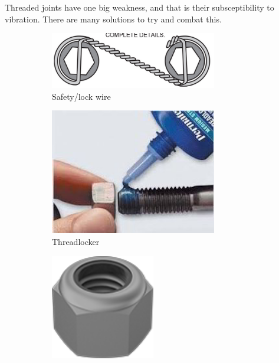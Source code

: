 	Threaded joints have one big weakness, and that is their subsceptibility to vibration. There are many solutions to try and combat this.
	\begin{figure}[H]
		\centering
		\begin{subfigure}[b]{.24\linewidth}
			\includegraphics[width=0.8\textwidth]{imgs/lockwire.png}
			\caption{Safety/lock wire}
		\end{subfigure}\begin{subfigure}[b]{.24\linewidth}
			\includegraphics[width=0.8\textwidth]{imgs/threadlocker.jpeg}
			\caption{Threadlocker}
		\end{subfigure}\begin{subfigure}[b]{.24\linewidth}
			\includegraphics[width=0.5\textwidth]{imgs/nylock.png}

\end{subfigure}
\end{figure}

